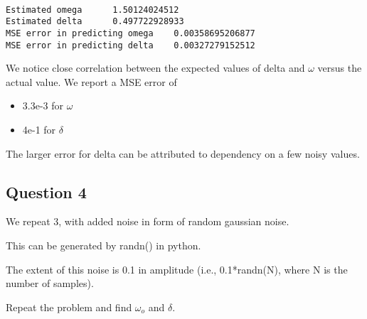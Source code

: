\documentclass[11pt]{article}
\providecommand{\tightlist}{%
      \setlength{\itemsep}{0pt}\setlength{\parskip}{0pt}}
\begin{document}
    \begin{center}
    \end{center}
    { \hspace*{\fill} \\}
    
    \begin{Verbatim}[commandchars=\\\{\}]
Estimated omega 	 1.50124024512
Estimated delta 	 0.497722928933
MSE error in predicting omega 	 0.00358695206877
MSE error in predicting delta 	 0.00327279152512

    \end{Verbatim}

    We notice close correlation between the expected values of delta and
\(\omega\) versus the actual value. We report a MSE error of

\begin{itemize}
\tightlist
\item
  3.3e-3 for \(\omega\)
\item
  4e-1 for \(\delta\)
\end{itemize}

The larger error for delta can be attributed to dependency on a few
noisy values.

\subsection{Question 4}\label{question-4}

We repeat 3, with added noise in form of random gaussian noise.

This can be generated by randn() in python.

The extent of this noise is 0.1 in amplitude (i.e., 0.1*randn(N), where
N is the number of samples).

Repeat the problem and find \(\omega_o\) and \(\delta\).
\end{document}
